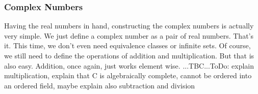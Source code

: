 








\subsubsection{Complex Numbers} Having the real numbers in hand, constructing the complex numbers is actually very simple. We just define a complex number as a pair of real numbers. That's it. This time, we don't even need equivalence classes or infinite sets. Of course, we still need to define the operations of addition and multiplication. But that is also easy. Addition, once again, just works element wise.  ...TBC...ToDo: explain multiplication, explain that C is algebraically complete, cannot be ordered into an ordered field, maybe explain also subtraction and division

